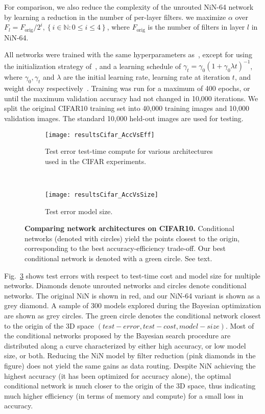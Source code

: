 \documentclass[thesis]{subfiles}
\begin{document}
	For comparison, we also reduce the complexity of the unrouted NiN-64 network by learning a reduction in the number of per-layer filters. 
	\ie we maximize $\alpha$ over $F_l = F_\textrm{orig}/2^i, \left\{i\in \mathbb{N} : 0 \le i \le 4\right\}$, where $F_\textrm{orig}$ is the number of filters in layer $l$ in NiN-64. 
	
	All networks were trained with the same hyperparameters as~\citep{Lin2013NiN}, 
	except for using the initialization strategy of~\citep{He2015b}, 
	and a learning schedule of $\gamma_t = \gamma_0(1+\gamma_0\lambda t)^{-1}$, where $\gamma_0,\gamma_t$ and $\lambda$ are the initial learning rate, learning rate at iteration $t$, and weight decay respectively~\citep{Bottou2012sgdtricks}. Training was run for a maximum of 400 epochs, or until the maximum validation accuracy had not changed in 10,000 iterations. 
	We split the original CIFAR10 training set into 40,000 training images and 
	10,000 validation images. 
	The standard 10,000 held-out images are used for testing.
	
	
	\begin{figure}[tbp] 
		\centering
		\begin{subfigure}[b]{0.95\linewidth}
			\centering
			\texttt{[image: resultsCifar\_AccVsEff]}
			\caption{Test error \vs test-time compute for various architectures used in the CIFAR experiments.}
			\label{fig:resultsCifar_AccVsEff}
		\end{subfigure}
		~
		\begin{subfigure}[b]{0.95\linewidth}
			\centering
			\texttt{[image: resultsCifar\_AccVsSize]}
			\caption{Test error \vs model size.}
			\label{fig:resultsCifar_AccVsSize}
		\end{subfigure}
		\caption[Comparing network architectures on CIFAR10]{{\bf Comparing network architectures on CIFAR10.} Conditional networks (denoted with circles) yield the points closest to the origin, corresponding to the best accuracy-efficiency trade-off. Our best conditional network is denoted with a green circle. See text.}
		\label{fig:Cifar_results}
	\end{figure}
	Fig.~\ref{fig:Cifar_results} shows test errors with respect to test-time cost and model size for multiple networks.
	Diamonds denote unrouted networks and circles denote conditional networks. 
	The original NiN is shown in red, and our NiN-64 variant is shown as a grey diamond.
	A sample of 300 models explored during the Bayesian optimization are shown as grey circles.
	The green circle denotes the conditional network closest to the origin of the 
	3D space $(test-error,test-cost,model-size)$.
	Most of the conditional networks proposed by the Bayesian search procedure are distributed along a curve characterized by either high accuracy, or low model size, or both. 
	Reducing the NiN model by filter reduction (pink diamonds in the figure) does not yield the same gains as data routing.
	Despite NiN achieving the highest accuracy (it has been optimized for accuracy alone), the optimal conditional network is much closer to the origin of the 3D space, thus indicating much higher efficiency (in terms of memory and compute) for a small loss in accuracy.
	
\end{document}
